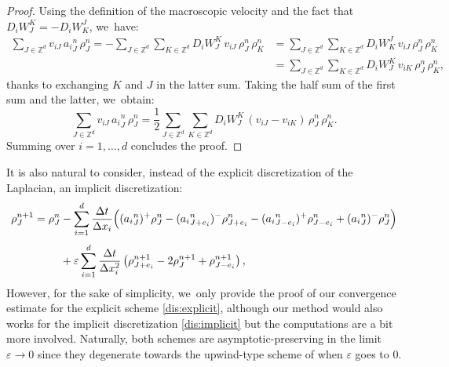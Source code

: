 \documentclass[11pt]{article}
\numberwithin{equation}{section}
\def\ZZ{\mathbb{Z}}
\def\eps{\varepsilon}
\def\dt{\Delta t}
\def\dx{\Delta x}
\theoremstyle{plain}
\theoremstyle{definition}
\begin{document}
\begin{proof}
Using the definition of the macroscopic velocity and the fact that $D_iW_{J}^{K} = -D_iW^{J}_{K}$, we~have:
\begin{align*}
\sum_{J\in \ZZ^d} v_{iJ} \, {a_i}^n_{J} \, \rho_{J}^n = - \sum_{J\in \ZZ^d} \sum_{K\in \ZZ^d} D_iW_J^K \, v_{iJ} \, \rho_{J}^n \, \rho_{K}^n & = \sum_{J\in \ZZ^d} \sum_{K\in \ZZ^d} D_iW_K^J \, v_{iJ} \, \rho_{J}^n \, \rho_{K}^n \\
& = \sum_{J\in \ZZ^d} \sum_{K\in \ZZ^d} D_iW_J^K \, v_{iK} \, \rho_{J}^n \, \rho_{K}^n,
\end{align*}
thanks to exchanging $K$ and $J$ in the latter sum. Taking the half sum of the first sum and the latter, we~obtain:
\[
\sum_{J\in \ZZ^d} v_{iJ} \, {a_i}^n_{J} \, \rho_{J}^n = \frac 12 \sum_{J\in \ZZ^d} \sum_{K\in \ZZ^d} D_iW_J^K \, (v_{iJ} - v_{iK}) \, \rho_{J}^n \, \rho_{K}^n.
\]
Summing over $i=1, \ldots, d$ concludes the proof.
\end{proof}
It is also natural to consider, instead of the explicit discretization of the Laplacian, an implicit discretization:
\begin{align}\label{dis:implicit}
\rho_{J}^{n+1} = \rho_{J}^n &- \sum_{i=1}^{d} \frac{\dt}{\dx_i}
\Big(({a_i}^n_{J})^+ \rho_{J}^n - ({a_i}^n_{J+e_i})^- \rho_{J+e_i}^n
-({a_i}^n_{J-e_i})^+ \rho_{J-e_i}^n + ({a_i}^n_{J})^- \rho_{J}^n \Big)\notag \\[-5pt]
\\[-8pt]
& + \eps \sum_{i=1}^{d} \frac{\dt}{\dx_i^2} \left(\rho_{J+e_i}^{n+1} - 2\rho_J^{n+1} + \rho_{J-e_i}^{n+1} \right),\notag
\end{align}
However, for the sake of simplicity, we~only provide the proof of our convergence estimate for the explicit scheme \eqref{dis:explicit}, although our method would also works for the implicit discretization \eqref{dis:implicit} but the computations are a bit more involved. Naturally, both schemes are asymptotic-preserving in the limit $\eps \to 0$ since they degenerate towards the upwind-type scheme of \cite{dlv20} when $\eps$ goes to 0.
\end{document}
